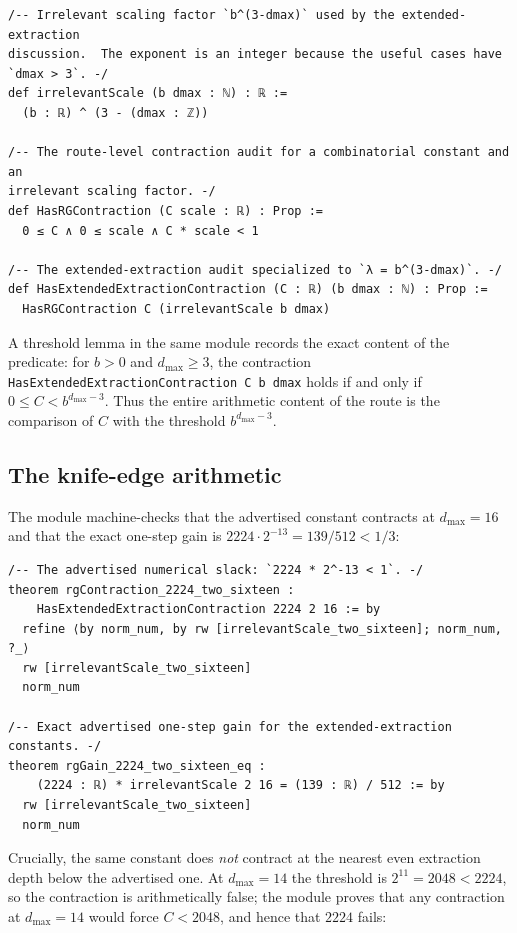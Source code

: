 \documentclass[11pt]{article}
\theoremstyle{definition}
\newcommand{\dmax}{d_{\max}}
\begin{document}
\begin{lstlisting}
/-- Irrelevant scaling factor `b^(3-dmax)` used by the extended-extraction
discussion.  The exponent is an integer because the useful cases have
`dmax > 3`. -/
def irrelevantScale (b dmax : ℕ) : ℝ :=
  (b : ℝ) ^ (3 - (dmax : ℤ))

/-- The route-level contraction audit for a combinatorial constant and an
irrelevant scaling factor. -/
def HasRGContraction (C scale : ℝ) : Prop :=
  0 ≤ C ∧ 0 ≤ scale ∧ C * scale < 1

/-- The extended-extraction audit specialized to `λ = b^(3-dmax)`. -/
def HasExtendedExtractionContraction (C : ℝ) (b dmax : ℕ) : Prop :=
  HasRGContraction C (irrelevantScale b dmax)
\end{lstlisting}

A threshold lemma in the same module records the exact content of the predicate:
for $b>0$ and $\dmax\geq 3$, the contraction \texttt{HasExtendedExtractionContraction
C b dmax} holds if and only if $0 \leq C < b^{\dmax-3}$. Thus the entire
arithmetic content of the route is the comparison of $C$ with the threshold
$b^{\dmax-3}$.

\subsection{The knife-edge arithmetic}

The module machine-checks that the advertised constant contracts at $\dmax=16$
and that the exact one-step gain is $2224\cdot 2^{-13} = 139/512 < 1/3$:

\begin{lstlisting}
/-- The advertised numerical slack: `2224 * 2^-13 < 1`. -/
theorem rgContraction_2224_two_sixteen :
    HasExtendedExtractionContraction 2224 2 16 := by
  refine ⟨by norm_num, by rw [irrelevantScale_two_sixteen]; norm_num, ?_⟩
  rw [irrelevantScale_two_sixteen]
  norm_num

/-- Exact advertised one-step gain for the extended-extraction constants. -/
theorem rgGain_2224_two_sixteen_eq :
    (2224 : ℝ) * irrelevantScale 2 16 = (139 : ℝ) / 512 := by
  rw [irrelevantScale_two_sixteen]
  norm_num
\end{lstlisting}

Crucially, the same constant does \emph{not} contract at the nearest even
extraction depth below the advertised one. At $\dmax=14$ the threshold is
$2^{11}=2048<2224$, so the contraction is arithmetically false; the module
proves that any contraction at $\dmax=14$ would force $C<2048$, and hence that
$2224$ fails:
\end{document}

